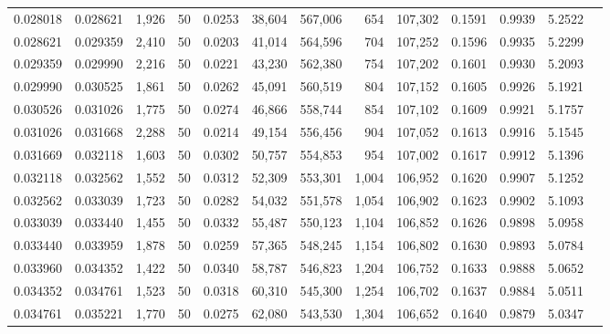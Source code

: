 \begin{tabular}{rrrrrrrrrrrrr}
0.028018 & 0.028621 & 1,926 &  50 &                                     0.0253 &  38,604 & 567,006 &     654 & 107,302 & 0.1591 & 0.9939 & 5.2522 \\
0.028621 & 0.029359 & 2,410 &  50 &                                     0.0203 &  41,014 & 564,596 &     704 & 107,252 & 0.1596 & 0.9935 & 5.2299 \\
0.029359 & 0.029990 & 2,216 &  50 &                                     0.0221 &  43,230 & 562,380 &     754 & 107,202 & 0.1601 & 0.9930 & 5.2093 \\
0.029990 & 0.030525 & 1,861 &  50 &                                     0.0262 &  45,091 & 560,519 &     804 & 107,152 & 0.1605 & 0.9926 & 5.1921 \\
0.030526 & 0.031026 & 1,775 &  50 &                                     0.0274 &  46,866 & 558,744 &     854 & 107,102 & 0.1609 & 0.9921 & 5.1757 \\
0.031026 & 0.031668 & 2,288 &  50 &                                     0.0214 &  49,154 & 556,456 &     904 & 107,052 & 0.1613 & 0.9916 & 5.1545 \\
0.031669 & 0.032118 & 1,603 &  50 &                                     0.0302 &  50,757 & 554,853 &     954 & 107,002 & 0.1617 & 0.9912 & 5.1396 \\
0.032118 & 0.032562 & 1,552 &  50 &                                     0.0312 &  52,309 & 553,301 &   1,004 & 106,952 & 0.1620 & 0.9907 & 5.1252 \\
0.032562 & 0.033039 & 1,723 &  50 &                                     0.0282 &  54,032 & 551,578 &   1,054 & 106,902 & 0.1623 & 0.9902 & 5.1093 \\
0.033039 & 0.033440 & 1,455 &  50 &                                     0.0332 &  55,487 & 550,123 &   1,104 & 106,852 & 0.1626 & 0.9898 & 5.0958 \\
0.033440 & 0.033959 & 1,878 &  50 &                                     0.0259 &  57,365 & 548,245 &   1,154 & 106,802 & 0.1630 & 0.9893 & 5.0784 \\
0.033960 & 0.034352 & 1,422 &  50 &                                     0.0340 &  58,787 & 546,823 &   1,204 & 106,752 & 0.1633 & 0.9888 & 5.0652 \\
0.034352 & 0.034761 & 1,523 &  50 &                                     0.0318 &  60,310 & 545,300 &   1,254 & 106,702 & 0.1637 & 0.9884 & 5.0511 \\
0.034761 & 0.035221 & 1,770 &  50 &                                     0.0275 &  62,080 & 543,530 &   1,304 & 106,652 & 0.1640 & 0.9879 & 5.0347 \\

\end{tabular}
